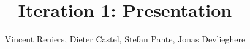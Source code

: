 \documentclass[xcolor=dvipsnames]{beamer}
\author{Vincent Reniers, Dieter Castel, Stefan Pante, Jonas Devlieghere}
\title{Iteration 1: Presentation}
\begin{document}
\begin{frame}
\maketitle
\end{frame}
\end{document}
